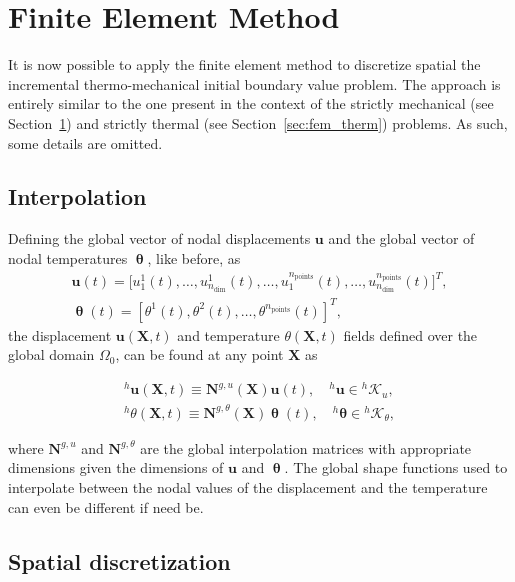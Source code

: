 \section{Finite Element Method} \label{sec:fem_mech}

It is now possible to apply the finite element method to discretize spatial the incremental thermo-mechanical initial boundary value problem.
The approach is entirely similar to the one present in the context of the strictly mechanical (see Section~\ref{sec:fem_mech}) and strictly thermal (see Section~\ref{sec:fem_therm}) problems.
As such, some details are omitted.

\subsection{Interpolation}

Defining the global vector of nodal displacements \(\mathbf u\) and the global vector of nodal temperatures \(\bm \uptheta\), like before, as
\begin{gather}
    \mathbf u(t) = \Big[ u_1^1(t),\dots,u^1_{n_\text{dim}}(t),\dots, u_1^{n_\text{points}}(t),\dots,u^{n_\text{points}}_{n_\text{dim}}(t)\Big]^T,\\
    \bm \uptheta(t) = \left[ \theta^1(t), \theta^2(t), \dots, \theta^{n_\text{points}}(t)\right]^T,
\end{gather}
the displacement $\bm u(\bm X, t)$ and temperature \(\theta(\bm X, t)\) fields defined over the global domain $\Omega_0$, can be found at any point $\bm X$ as
\begin{highlight}[innertopmargin=-5pt]
    \begin{gather}
        ^h\bm u(\bm X, t) \equiv \mathbf N^{g,u}(\bm X)\mathbf u(t),\quad ^h\bm u\in {}^h\mathscr{K}_u,\\
        ^h\theta(\bm X, t) \equiv \mathbf N^{g,\theta}(\bm X)\bm \uptheta(t),\quad ^h\bm \theta\in {}^h\mathscr{K}_\theta,
    \end{gather}
\end{highlight}
where \(\mathbf N^{g,u}\) and \(\mathbf N^{g,\theta}\) are the global interpolation matrices with appropriate dimensions given the dimensions of \(\mathbf u\) and \(\bm \uptheta\).
The global shape functions used to interpolate between the nodal values of the displacement and the temperature can even be different if need be.

\subsection{Spatial discretization} \label{sec:spatial_discretization}

